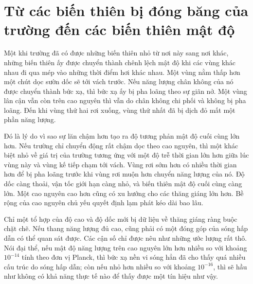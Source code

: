 \begin{classroomqa}
\end{classroomqa}

\section{Từ các biến thiên bị đóng băng của trường đến các biến thiên mật độ}

Một khi trường đã có được những biến thiên nhỏ từ nơi này sang nơi khác, những biến thiên ấy được chuyển thành chênh lệch mật độ khi các vùng khác nhau đi qua mép vào những thời điểm hơi khác nhau. Một vùng nằm thấp hơn một chút dọc sườn dốc sẽ tới vách trước. Nếu năng lượng chân không của nó được chuyển thành bức xạ, thì bức xạ ấy bị pha loãng theo sự giãn nở. Một vùng lân cận vẫn còn trên cao nguyên thì vẫn do chân không chi phối và không bị pha loãng. Đến khi vùng thứ hai rơi xuống, vùng thứ nhất đã bị dịch đỏ mất một phần năng lượng.

Đó là lý do vì sao sự lăn chậm hơn tạo ra độ tương phản mật độ cuối cùng lớn hơn. Nếu trường chỉ chuyển động rất chậm dọc theo cao nguyên, thì một khác biệt nhỏ về giá trị của trường tương ứng với một độ trễ thời gian lớn hơn giữa lúc vùng này và vùng kế tiếp chạm tới vách. Vùng rơi sớm hơn có nhiều thời gian hơn để bị pha loãng trước khi vùng rơi muộn hơn chuyển năng lượng của nó. Độ dốc càng thoải, vận tốc giới hạn càng nhỏ, và biến thiên mật độ cuối cùng càng lớn. Một cao nguyên cao hơn cũng có xu hướng cho các thăng giáng lớn hơn. Bề rộng của cao nguyên chủ yếu quyết định lạm phát kéo dài bao lâu.

Chỉ một tổ hợp của độ cao và độ dốc mới bị dữ liệu về thăng giáng ràng buộc chặt chẽ. Nếu thang năng lượng đủ cao, cũng phải có một đóng góp của sóng hấp dẫn có thể quan sát được. Các cận số chỉ được nêu như những ước lượng rất thô. Nói đại thể, nếu mật độ năng lượng trên cao nguyên lớn hơn nhiều so với khoảng \(10^{-14}\) tính theo đơn vị Planck, thì bức xạ nền vi sóng hẳn đã cho thấy quá nhiều cấu trúc do sóng hấp dẫn; còn nếu nhỏ hơn nhiều so với khoảng \(10^{-16}\), thì sẽ hầu như không có khả năng thực tế nào để thấy được một tín hiệu như vậy. 

